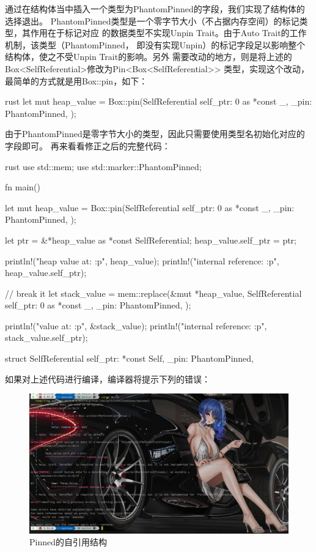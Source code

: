 通过在结构体当中插入一个类型为PhantomPinned的字段，我们实现了结构体的选择退出。
PhantomPinned类型是一个零字节大小（不占据内存空间）的标记类型，其作用在于标记对应
的数据类型不实现Unpin Trait。由于Auto Trait的工作机制，该类型（PhantomPinned，
即没有实现Unpin）的标记字段足以影响整个结构体，使之不受Unpin Trait的影响。另外
需要改动的地方，则是将上述的Box<SelfReferential>修改为Pin<Box<SelfReferential>>
类型，实现这个改动，最简单的方式就是用Box::pin，如下：
\begin{code-block}{rust}
let mut heap_value = Box::pin(SelfReferential {
    self_ptr: 0 as *const _,
    _pin: PhantomPinned,
});
\end{code-block}
由于PhantomPinned是零字节大小的类型，因此只需要使用类型名初始化对应的字段即可。
再来看看修正之后的完整代码：
\begin{code-block}{rust}
use std::mem;
use std::marker::PhantomPinned;

fn main() {

    let mut heap_value = Box::pin(SelfReferential {
        self_ptr: 0 as *const _,
        _pin: PhantomPinned,
    });

    let ptr = &*heap_value as *const SelfReferential;
    heap_value.self_ptr = ptr;

    println!("heap value at: {:p}", heap_value);
    println!("internal reference: {:p}", heap_value.self_ptr);

    // break it
    let stack_value = mem::replace(&mut *heap_value, SelfReferential {
        self_ptr: 0 as *const _,
        _pin: PhantomPinned,
    });

    println!("value at: {:p}", &stack_value);
    println!("internal reference: {:p}", stack_value.self_ptr);
}

struct SelfReferential {
    self_ptr: *const Self,
    _pin: PhantomPinned,
}
\end{code-block}
如果对上述代码进行编译，编译器将提示下列的错误：
\begin{figure}[H]
  \centering
  \includegraphics[width=\linewidth]{self_ref_pinned.png}
  \caption{Pinned的自引用结构}
  \label{fig:self_ref_pinned}
\end{figure}

